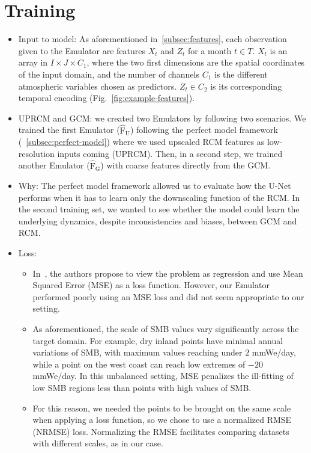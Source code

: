 \documentclass[a4paper,11pt,oneside]{report}
\begin{document}
\section{Training}\label{subsec:training}
\begin{itemize}
    \item Input to model: As aforementioned in~\ref{subsec:features}, each observation given to the Emulator are features $X_t$ and $Z_t$ for a month $t\in T$. $X_t$ is an array in $I \times J \times C_1$, where the two first dimensions are the spatial coordinates of the input domain, and the number of channels $C_1$ is the different atmospheric variables chosen as predictors. $Z_t \in C_2$ is its corresponding temporal encoding (Fig.~\ref{fig:example-features}).
    \item UPRCM and GCM: we created two Emulators by following two scenarios. We trained the first Emulator ($\operatorname{\hat{F}_U}$) following the perfect model framework (~\ref{subsec:perfect-model}) where we used upscaled RCM features as low-resolution inputs coming (UPRCM). Then, in a second step, we trained another Emulator ($\operatorname{\hat{F}_G}$) with coarse features directly from the GCM. 
    \item Why: The perfect model framework allowed us to evaluate how the U-Net performs when it has to learn only the downscaling function of the RCM. In the second training set, we wanted to see whether the model could learn the underlying dynamics, despite inconsistencies and biases, between GCM and RCM. 
    \item Loss: 
    \begin{itemize}
        \item In~\cite{Doury}, the authors propose to view the problem as regression and use Mean Squared Error (MSE) as a loss function. However, our Emulator performed poorly using an MSE loss and did not seem appropriate to our setting. 
        \item As aforementioned, the scale of SMB values vary significantly across the target domain. For example, dry inland points have minimal annual variations of SMB, with maximum values reaching under $2$ \si{mmWe/day}, while a point on the west coast can reach low extremes of $-20$ \si{mmWe/day}. In this unbalanced setting, MSE penalizes the ill-fitting of low SMB regions less than points with high values of SMB.  
        \item For this reason, we needed the points to be brought on the same scale when applying a loss function, so we chose to use a normalized RMSE (NRMSE) loss. Normalizing the RMSE facilitates comparing datasets with different scales, as in our case. 

\end{itemize}
\end{itemize}
\end{document}
